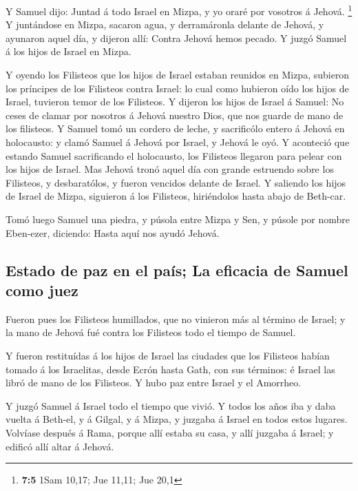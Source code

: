  Y Samuel dijo: Juntad á todo Israel en Mizpa, y yo oraré
por vosotros á Jehová. \footnote{\textbf{7:5} 1Sam 10,17; Jue 11,11; Jue
  20,1}  Y juntándose en Mizpa, sacaron agua, y derramáronla
delante de Jehová, y ayunaron aquel día, y dijeron allí: Contra Jehová
hemos pecado. Y juzgó Samuel á los hijos de Israel en Mizpa.

 Y oyendo los Filisteos que los hijos de Israel estaban
reunidos en Mizpa, subieron los príncipes de los Filisteos contra
Israel: lo cual como hubieron oído los hijos de Israel, tuvieron temor
de los Filisteos.  Y dijeron los hijos de Israel á Samuel:
No ceses de clamar por nosotros á Jehová nuestro Dios, que nos guarde de
mano de los filisteos.  Y Samuel tomó un cordero de leche, y
sacrificólo entero á Jehová en holocausto: y clamó Samuel á Jehová por
Israel, y Jehová le oyó.  Y aconteció que estando Samuel
sacrificando el holocausto, los Filisteos llegaron para pelear con los
hijos de Israel. Mas Jehová tronó aquel día con grande estruendo sobre
los Filisteos, y desbaratólos, y fueron vencidos delante de Israel.
 Y saliendo los hijos de Israel de Mizpa, siguieron á los
Filisteos, hiriéndolos hasta abajo de Beth-car.

 Tomó luego Samuel una piedra, y púsola entre Mizpa y Sen,
y púsole por nombre Eben-ezer, diciendo: Hasta aquí nos ayudó Jehová.

\hypertarget{estado-de-paz-en-el-pauxeds-la-eficacia-de-samuel-como-juez}{%
\subsection{Estado de paz en el país; La eficacia de Samuel como
juez}\label{estado-de-paz-en-el-pauxeds-la-eficacia-de-samuel-como-juez}}

 Fueron pues los Filisteos humillados, que no vinieron más
al término de Israel; y la mano de Jehová fué contra los Filisteos todo
el tiempo de Samuel.

 Y fueron restituídas á los hijos de Israel las ciudades
que los Filisteos habían tomado á los Israelitas, desde Ecrón hasta
Gath, con sus términos: é Israel las libró de mano de los Filisteos. Y
hubo paz entre Israel y el Amorrheo.

 Y juzgó Samuel á Israel todo el tiempo que vivió.
 Y todos los años iba y daba vuelta á Beth-el, y á Gilgal,
y á Mizpa, y juzgaba á Israel en todos estos lugares. 
Volvíase después á Rama, porque allí estaba su casa, y allí juzgaba á
Israel; y edificó allí altar á Jehová.

